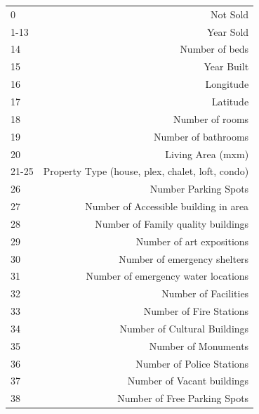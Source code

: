 \documentclass{acm_proc_article-sp}
\begin{document}
\begin{tabular}{ l | r }
  0 & Not Sold \\
  1-13 & Year Sold \\
  14 & Number of beds \\
  15 & Year Built\\
  16 & Longitude\\
  17 & Latitude\\
  18 & Number of rooms\\
  19 & Number of bathrooms\\
  20 & Living Area (mxm)\\
  21-25 & Property Type (house, plex, chalet, loft, condo)\\
  26 & Number Parking Spots\\
  27 & Number of Accessible building in area\\
  28 & Number of Family quality buildings\\
  29 & Number of art expositions\\
  30 & Number of emergency shelters\\
  31 & Number of emergency water locations\\
  32 & Number of Facilities\\
  33 & Number of Fire Stations\\
  34 & Number of Cultural Buildings\\
  35 & Number of Monuments\\
  36 & Number of Police Stations\\
  37 & Number of Vacant buildings \\
  38 & Number of Free Parking Spots\\
\end{tabular}
\end{document}
